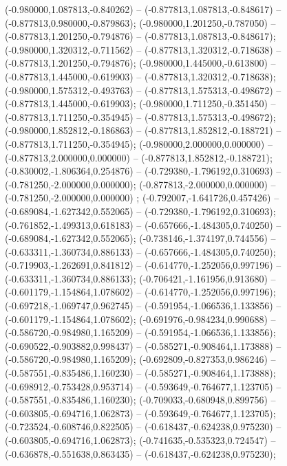  (-0.980000,1.087813,-0.840262) -- (-0.877813,1.087813,-0.848617) -- (-0.877813,0.980000,-0.879863);
 (-0.980000,1.201250,-0.787050) -- (-0.877813,1.201250,-0.794876) -- (-0.877813,1.087813,-0.848617);
 (-0.980000,1.320312,-0.711562) -- (-0.877813,1.320312,-0.718638) -- (-0.877813,1.201250,-0.794876);
 (-0.980000,1.445000,-0.613800) -- (-0.877813,1.445000,-0.619903) -- (-0.877813,1.320312,-0.718638);
 (-0.980000,1.575312,-0.493763) -- (-0.877813,1.575313,-0.498672) -- (-0.877813,1.445000,-0.619903);
 (-0.980000,1.711250,-0.351450) -- (-0.877813,1.711250,-0.354945) -- (-0.877813,1.575313,-0.498672);
 (-0.980000,1.852812,-0.186863) -- (-0.877813,1.852812,-0.188721) -- (-0.877813,1.711250,-0.354945);
 (-0.980000,2.000000,0.000000) -- (-0.877813,2.000000,0.000000) -- (-0.877813,1.852812,-0.188721);
 (-0.830002,-1.806364,0.254876) -- (-0.729380,-1.796192,0.310693) -- (-0.781250,-2.000000,0.000000);
 (-0.877813,-2.000000,0.000000) -- (-0.781250,-2.000000,0.000000) ;
 (-0.792007,-1.641726,0.457426) -- (-0.689084,-1.627342,0.552065) -- (-0.729380,-1.796192,0.310693);
 (-0.761852,-1.499313,0.618183) -- (-0.657666,-1.484305,0.740250) -- (-0.689084,-1.627342,0.552065);
 (-0.738146,-1.374197,0.744556) -- (-0.633311,-1.360734,0.886133) -- (-0.657666,-1.484305,0.740250);
 (-0.719903,-1.262691,0.841812) -- (-0.614770,-1.252056,0.997196) -- (-0.633311,-1.360734,0.886133);
 (-0.706421,-1.161956,0.913680) -- (-0.601179,-1.154864,1.078602) -- (-0.614770,-1.252056,0.997196);
 (-0.697218,-1.069747,0.962745) -- (-0.591954,-1.066536,1.133856) -- (-0.601179,-1.154864,1.078602);
 (-0.691976,-0.984234,0.990688) -- (-0.586720,-0.984980,1.165209) -- (-0.591954,-1.066536,1.133856);
 (-0.690522,-0.903882,0.998437) -- (-0.585271,-0.908464,1.173888) -- (-0.586720,-0.984980,1.165209);
 (-0.692809,-0.827353,0.986246) -- (-0.587551,-0.835486,1.160230) -- (-0.585271,-0.908464,1.173888);
 (-0.698912,-0.753428,0.953714) -- (-0.593649,-0.764677,1.123705) -- (-0.587551,-0.835486,1.160230);
 (-0.709033,-0.680948,0.899756) -- (-0.603805,-0.694716,1.062873) -- (-0.593649,-0.764677,1.123705);
 (-0.723524,-0.608746,0.822505) -- (-0.618437,-0.624238,0.975230) -- (-0.603805,-0.694716,1.062873);
 (-0.741635,-0.535323,0.724547) -- (-0.636878,-0.551638,0.863435) -- (-0.618437,-0.624238,0.975230);
